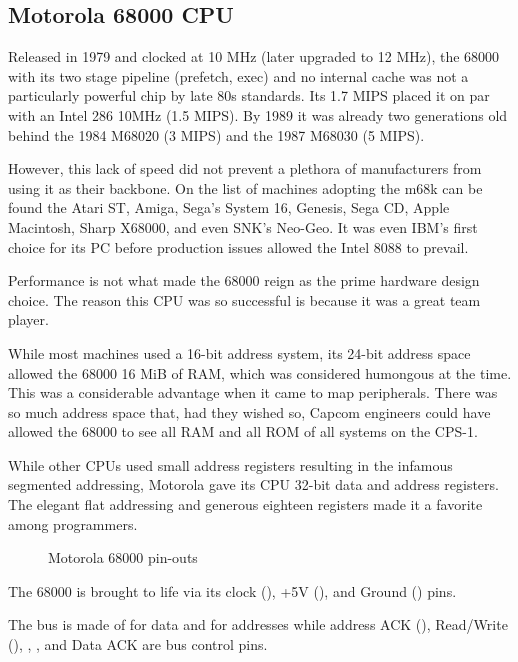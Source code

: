\subsection{Motorola 68000 CPU}

 Released in 1979 and clocked at 10 MHz (later upgraded to 12 MHz), the 68000 with its two stage pipeline\cite{M68000fv} (prefetch, exec) and no internal cache was not a particularly powerful chip by late 80s standards. Its 1.7 MIPS placed it on par with an Intel 286 10MHz (1.5 MIPS). By 1989 it was already two generations old behind the 1984 M68020 (3 MIPS) and the 1987 M68030 (5 MIPS)\cite{mips}.


However, this lack of speed did not prevent a plethora of manufacturers from using it as their backbone. On the list of machines adopting the m68k can be found the Atari ST, Amiga, Sega's System 16, Genesis, Sega CD, Apple Macintosh, Sharp X68000, and even SNK's Neo-Geo. It was even IBM's first choice for its PC before production issues allowed the Intel 8088 to prevail\cite{ieee20170630}. 

Performance is not what made the 68000 reign as the prime hardware design choice. The reason this CPU was so successful is because it was a great team player.

While most machines used a 16-bit address system, its 24-bit address space allowed the 68000 16 MiB of RAM, which was considered humongous at the time. This was a considerable advantage when it came to map peripherals. There was so much address space that, had they wished so, Capcom engineers could have allowed the 68000 to see all RAM and all ROM of all systems on the CPS-1.

While other CPUs used small address registers resulting in the infamous segmented addressing, Motorola gave its CPU 32-bit data and address registers. The elegant flat addressing and generous eighteen registers made it a favorite among programmers. 


\begin{figure}[H]

 
 \caption*{Motorola 68000 pin-outs}
\label{68000drawing}
  \end{figure}



The 68000 is brought to life via its clock (), +5V (), and Ground () pins.

The bus is made of  for data and  for addresses while address ACK (), Read/Write (), , , and Data ACK  are bus control pins.


